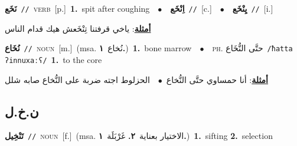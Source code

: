 \documentclass[10pt,a4paper,twoside]{article} %
\begin{document}
\begin{multicols}{2}
{\setlength\topsep{0pt}\textbf{\foreignlanguage{arabic}{نَخَع}}\ {\color{gray}\texttt{//}\color{black}}\ \textsc{verb}\ [p.]\ \textbf{1.}~spit after coughing\ \ $\bullet$\ \ \setlength\topsep{0pt}\textbf{\foreignlanguage{arabic}{اِنْخَع}}\ {\color{gray}\texttt{//}\color{black}}\ [c.]\ \ $\bullet$\ \ \setlength\topsep{0pt}\textbf{\foreignlanguage{arabic}{يِنْخَع}}\ {\color{gray}\texttt{//}\color{black}}\ [i.]\  \begin{flushright}\color{gray}\foreignlanguage{arabic}{\textbf{\underline{\foreignlanguage{arabic}{أمثلة}}}: ياخي قرفتنا تِنْخَعش هيك قدام الناس}\end{flushright}\color{black}} \vspace{2mm}

{\setlength\topsep{0pt}\textbf{\foreignlanguage{arabic}{نُخَاع}}\ {\color{gray}\texttt{//}\color{black}}\ \textsc{noun}\ [m.]\ \color{gray}(msa. \foreignlanguage{arabic}{نُخاع}~\foreignlanguage{arabic}{\textbf{١.}})\color{black}\ \textbf{1.}~bone marrow\ \ $\bullet$\ \ \textsc{ph.} \color{gray} \foreignlanguage{arabic}{حتَّى النُّخَاع}\color{black}\ {\color{gray}\texttt{/{\sffamily ħatta ʔinnuxaːʕ}/}\color{black}}\ \textbf{1.}~to the core\  \begin{flushright}\color{gray}\foreignlanguage{arabic}{\textbf{\underline{\foreignlanguage{arabic}{أمثلة}}}: أنا حمساوي حتَّى النُّخاع\ $\bullet$\ \  الحزلوط اجته ضربة على النُّخاع صابه شلل}\end{flushright}\color{black}} \vspace{2mm}

\vspace{-3mm}
\subsection*{\color{blue}\foreignlanguage{arabic}{ن.خ.ل}\color{blue}{}} 

{\setlength\topsep{0pt}\textbf{\foreignlanguage{arabic}{تَنْخِيل}}\ {\color{gray}\texttt{//}\color{black}}\ \textsc{noun}\ [f.]\ \color{gray}(msa. \foreignlanguage{arabic}{الاختيار بعناية}~\foreignlanguage{arabic}{\textbf{٢.}}  \foreignlanguage{arabic}{غَرْبَلَة}~\foreignlanguage{arabic}{\textbf{١.}})\color{black}\ \textbf{1.}~sifting  \textbf{2.}~selection\ } \vspace{2mm}


\end{multicols}
\end{document}
